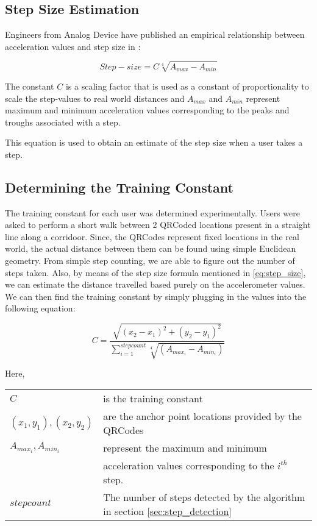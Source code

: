 \documentclass[10pt,journal,letterpaper,compsoc]{IEEEtran}
\begin{document}
\subsection{Step Size Estimation}

Engineers from Analog Device have published an empirical relationship between 
acceleration values and step size in \cite{ADXL202}:

\begin{equation}\label{eq:step_size}
 Step-size = C \sqrt[4]{A_{max} - A_{min}}
\end{equation}

The constant $C$ is a scaling factor that is used as a constant of proportionality
to scale the step-values to real world distances and $A_{max}$ and $A_{min}$
represent maximum and minimum acceleration values corresponding to the 
peaks and troughs associated with a step. 

This equation is used to obtain an estimate of the step size when a user 
takes a step.

\subsection{Determining the Training Constant}

The training constant for each user was determined experimentally. 
Users were asked to perform a short walk between 2 QRCoded locations
present in a straight line along a corridoor.
Since, the QRCodes represent fixed locations in the real world, the actual 
distance between them can be found using simple Euclidean geometry. From 
simple step counting, we are able to figure out the number of steps taken.
Also, by means of the step size formula mentioned in \eqref{eq:step_size},
we can estimate the distance travelled based purely on the accelerometer
values. We can then find the training constant by simply plugging in 
the values into the following equation:

\begin{equation}
C=\frac{\sqrt{(x_{2}-x_{1})^{2}+(y_{2}-y_{1})^{2}}}{\sum_{i=1}^{stepcount}\sqrt[4]{(A_{max_{i}}-A_{min_{i}})}}
\end{equation}

Here,\\
\begin{tabular}{l l}
$C$                         & is the training constant   \\
$(x_1, y_1), (x_2, y_2)$    & are the anchor point locations provided by the QRCodes \\
$A_{max_{i}}, A_{min_{i}}$  & represent the maximum and minimum \\
                            & acceleration values corresponding to the $i^{th}$ step.\\
$stepcount$                 & The number of steps detected by the algorithm in section \ref{sec:step_detection} \\
\end{tabular}
\end{document}
